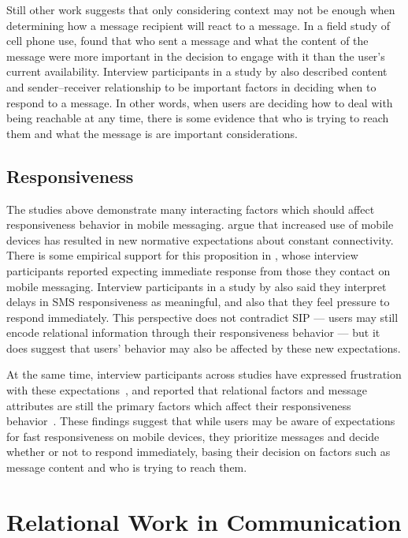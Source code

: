 \documentclass[12pt]{nuthesis}	%
\begin{document}
Still other work suggests that only considering context may not be enough when determining how a message recipient will react to a message. In a field study of cell phone use, \citet{grandhi2010technology} found that who sent a message and what the content of the message were more important in the decision to engage with it than the user's current availability. Interview participants in a study by \citet{wohn2015ambient} also described content and sender--receiver relationship to be important factors in deciding when to respond to a message. In other words, when users are deciding how to deal with being reachable at any time, there is some evidence that who is trying to reach them and what the message is are important considerations.

\subsection{Responsiveness}

The studies above demonstrate many interacting factors which should affect responsiveness behavior in mobile messaging. \citet{bayer2015connection} argue that increased use of mobile devices has resulted in new normative expectations about constant connectivity. There is some empirical support for this proposition in \citet{church2013s}, whose interview participants reported expecting immediate response from those they contact on mobile messaging. Interview participants in a study by \citet{rettie2009mobile} also said they interpret delays in SMS responsiveness as meaningful, and also that they feel pressure to respond immediately. This perspective does not contradict SIP --- users may still encode relational information through their responsiveness behavior --- but it does suggest that users' behavior may also be affected by these new expectations.

At the same time, interview participants across studies have expressed frustration with these expectations~\citep{ames2013managing}, and reported that relational factors and message attributes are still the primary factors which affect their responsiveness behavior~\citep{grandhi2010technology,wohn2015ambient}. These findings suggest that while users may be aware of expectations for fast responsiveness on mobile devices, they prioritize messages and decide whether or not to respond immediately, basing their decision on factors such as message content and who is trying to reach them.

\section{Relational Work in Communication}
\end{document}
